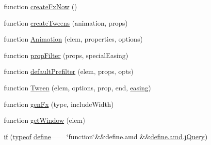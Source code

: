 \begin{DoxyCompactItemize}
function \hyperlink{jquery-1_89_81_8js_a3c7bcef859b0811abb1dbf890c6cc635}{create\+Fx\+Now} ()
\item 
function \hyperlink{jquery-1_89_81_8js_a56c4c9171da10f633f5015b634b39bfb}{create\+Tweens} (animation, props)
\item 
function \hyperlink{jquery-1_89_81_8js_aa33f7dcb8ee41587d545a0bc69849296}{Animation} (elem, properties, options)
\item 
function \hyperlink{jquery-1_89_81_8js_a0196d1f08ae60b747901b5a2950f72f1}{prop\+Filter} (props, special\+Easing)
\item 
function \hyperlink{jquery-1_89_81_8js_a8041b1040535dcee84ad474aaaf11dde}{default\+Prefilter} (elem, props, opts)
\item 
function \hyperlink{jquery-1_89_81_8js_adcb517ce3709049d37bb5f5bd3811edf}{Tween} (elem, options, prop, end, \hyperlink{jquery-1_89_81_8js_a9758a312629fa6de1744280dd6e6253b}{easing})
\item 
function \hyperlink{jquery-1_89_81_8js_a0dad9ae6c57fd32a071de202faa87081}{gen\+Fx} (type, include\+Width)
\item 
function \hyperlink{jquery-1_89_81_8js_ab8e6e1fb3b8b51b6afe437c63df0e09f}{get\+Window} (elem)
\item 
\hyperlink{jquery-1_89_81_8js_ab5582cce20b35070b73869356a852365}{if} (\hyperlink{extras_2_scroller_2media_2docs_2media_2js_2sh_brush_j_script_8js_a93a9266f92d6d68644e7aa63da3caa11}{typeof} \hyperlink{tinymce_8js_a86a0e277e82d8a0d8be415badd12eebc}{define}===\char`\"{}function\char`\"{}\&\&define.\+amd \&\&\hyperlink{_site_bundle_2_resources_2public_2js_2_specific_functions_8js_ada154f66b5b2b806f5e239376e925644}{define.\+amd.\+j\+Query})
\end{DoxyCompactItemize}
